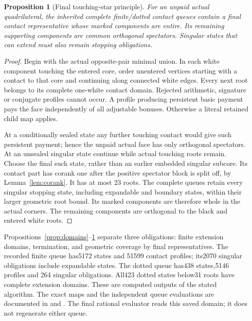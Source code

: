 \documentclass[11pt]{article}
\newtheorem{proposition}[theorem]{Proposition}
\begin{document}
\begin{proposition}[Final touching-star principle]\label{prop:coverage}
For an unpaid actual quadrilateral, the inherited complete finite/dotted
contact queues contain a final contact representative whose marked
components are entire. Its remaining supporting components are common
orthogonal spectators. Singular states that can extend must also remain
stopping obligations.
\end{proposition}
\begin{proof}
Begin with the actual opposite-pair minimal union. In each white
component touching the entered core, order unentered vertices starting
with a contact to that core and continuing along connected white edges.
Every next root belongs to its complete one-white contact domain.
Rejected arithmetic, signature or conjugate profiles cannot occur.
A profile producing persistent basic payment pays the face independently
of all adjustable bonuses. Otherwise a literal retained child map applies.

At a conditionally sealed state any further touching contact would give
such persistent payment; hence the unpaid actual face has only orthogonal
spectators. At an unsealed singular state continue while actual touching
roots remain. Choose the final such state, rather than an earlier
embedded singular subcore. Its contact part has corank one after the
positive spectator block is split off, by Lemma~\ref{lem:corank}. It has
at most 23 roots. The complete queues retain every singular stopping
state, including expandable and boundary states, within their larger
geometric root bound. Its marked components are therefore whole in the
actual corners. The remaining components are orthogonal to the black
and entered white roots.
\end{proof}
Propositions~\ref{prop:domains}--\ref{prop:coverage} separate three
obligations: finite extension domains, termination, and geometric
coverage by final representatives. The recorded finite queue has5172
states and 51599 contact profiles; its2070 singular obligations include
expandable states. The dotted queue has438 states,5146 profiles and 264
singular obligations. All423 dotted states below31 roots have complete
extension domains. These are computed outputs of the stated algorithm.
The exact maps and the independent queue evaluations are documented in
and .
The final rational evaluator reads this saved domain; it does not
regenerate either queue.
\end{document}
